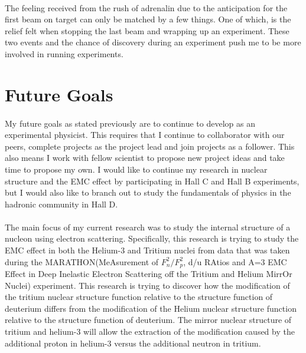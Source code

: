 \documentclass[12pt,letterpaper]{article}
\begin{document}
\paragraph{} The feeling received from the rush of adrenalin due to the anticipation for the first beam on target can only be matched by a few things. One of which, is the relief felt when stopping the last beam and wrapping up an experiment. These two events and the chance of discovery during an experiment push me to be more involved in running experiments.
\vspace{-1em}
\section*{Future Goals}
\paragraph{}My future goals as stated previously are to continue to develop as an experimental physicist. This requires that I continue to collaborator with our peers, complete projects as the project lead and join projects as a follower. This also means I work with fellow scientist to propose new project ideas and take time to propose my own. I would like to continue my research in nuclear structure and the EMC effect by participating in Hall C and Hall B experiments, but I would also like to branch out to study the fundamentals of physics in the hadronic community in Hall D. 





\iffalse
\paragraph{}The main focus of my current research was to study the internal structure of a nucleon using electron scattering. Specifically, this research is trying to study the EMC effect in both the Helium-3 and Tritium nuclei from data that was taken during the MARATHON(MeAsurement of $F_n^2/F_p^2$, d/u RAtios and A=3 EMC Effect in Deep Inelastic Electron Scattering off the Tritium and Helium MirrOr Nuclei) experiment. This research is trying to discover how the modification of the tritium nuclear structure function relative to the structure function of deuterium differs from the modification of the Helium nuclear structure function relative to the structure function of deuterium. The mirror nuclear structure of tritium and helium-3 will allow the extraction of the modification caused by the additional proton in helium-3 versus the additional neutron in tritium. 
\end{document}
